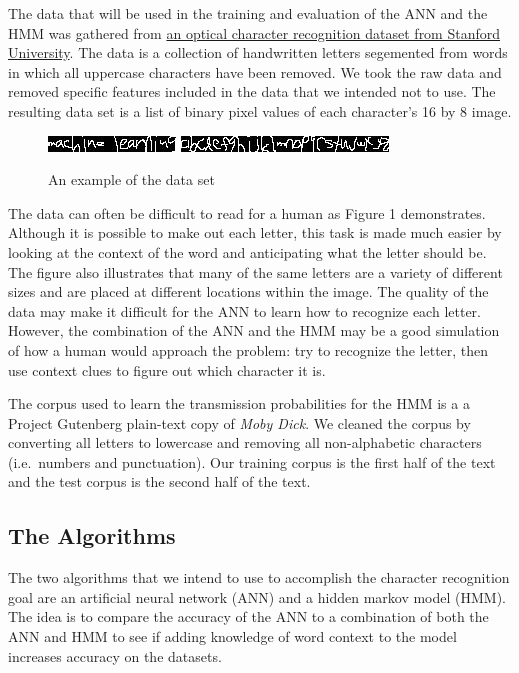 \documentclass[11pt,a4paper,twocolumn]{article}
\begin{document}
The data that will be used in the training and evaluation of the ANN and the HMM was gathered from
\href{http://ai.stanford.edu/~btaskar/ocr/}{an optical character recognition dataset from
Stanford University}.
The data is a collection of handwritten letters segemented from words in which all uppercase
characters have been removed. We took the raw data and removed specific features included in the
data that we intended not to use. The resulting data set is a list of binary pixel values of each
character's 16 by 8 image.  \begin{figure}[h]
    \centering
    \includegraphics{img/ml.jpg}
    \includegraphics{img/alphabet.jpg}
    \caption{An example of the data set}
\end{figure}

The data can often be difficult to read for a human as Figure 1 demonstrates.
Although it is possible to make out each letter, this task is made much
easier by looking at the context of the word and anticipating what the letter
should be. The figure also illustrates that many of the same letters are a
variety of different sizes and are placed at different locations within the
image. The quality of the data may make it difficult for the ANN to learn how
to recognize each letter. However, the combination of the ANN and the HMM may
be a good simulation of how a human would approach the problem: try to
recognize the letter, then use context clues to figure out which character it
is.

The corpus used to learn the transmission probabilities for the HMM is a
a Project Gutenberg plain-text copy of \emph{Moby Dick}. We cleaned the
corpus by converting all letters to lowercase and removing all non-alphabetic
characters (i.e.\ numbers and punctuation). Our training corpus is the first
half of the text and the test corpus is the second half of the text.

\subsection*{The Algorithms}

The two algorithms that we intend to use to accomplish the character recognition goal are an
artificial neural network (ANN) and a hidden markov model (HMM). The idea is to compare the accuracy
of the ANN to a combination of both the ANN and HMM to see if adding knowledge of word context to
the model increases accuracy on the datasets.
\end{document}

